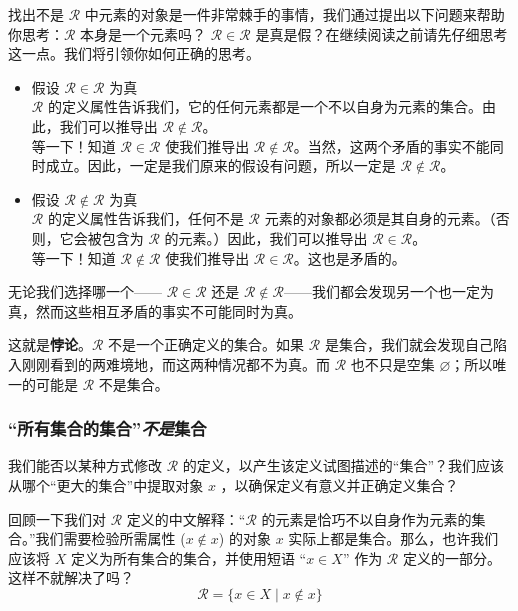 找出不是 $\mathcal{R}$ 中元素的对象是一件非常棘手的事情，我们通过提出以下问题来帮助你思考：$\mathcal{R}$ 本身是一个元素吗？ $\mathcal{R} \in \mathcal{R}$ 是真是假？在继续阅读之前请先仔细思考这一点。我们将引领你如何正确的思考。

\begin{itemize}
    \item 假设 $\mathcal{R} \in \mathcal{R}$ 为真 \\
    $\mathcal{R}$ 的定义属性告诉我们，它的任何元素都是一个不以自身为元素的集合。由此，我们可以推导出 $\mathcal{R} \notin \mathcal{R}$。\\
    等一下！知道 $\mathcal{R} \in \mathcal{R}$ 使我们推导出 $\mathcal{R} \notin \mathcal{R}$。当然，这两个矛盾的事实不能同时成立。因此，一定是我们原来的假设有问题，所以一定是 $\mathcal{R} \notin \mathcal{R}$。
    \item 假设 $\mathcal{R} \notin \mathcal{R}$ 为真 \\
    $\mathcal{R}$ 的定义属性告诉我们，任何不是 $\mathcal{R}$ 元素的对象都必须是其自身的元素。（否则，它会被包含为 $\mathcal{R}$ 的元素。）因此，我们可以推导出 $\mathcal{R} \in \mathcal{R}$。\\
    等一下！知道 $\mathcal{R} \notin \mathcal{R}$ 使我们推导出 $\mathcal{R} \in \mathcal{R}$。这也是矛盾的。
\end{itemize}
无论我们选择哪一个—— $\mathcal{R} \in \mathcal{R}$ 还是 $\mathcal{R} \notin \mathcal{R}$——我们都会发现另一个也一定为真，然而这些相互矛盾的事实不可能同时为真。

这就是\textbf{悖论}。$\mathcal{R}$ 不是一个正确定义的集合。如果 $\mathcal{R}$ 是集合，我们就会发现自己陷入刚刚看到的两难境地，而这两种情况都不为真。而 $\mathcal{R}$ 也不只是空集 $\varnothing$；所以唯一的可能是 $\mathcal{R}$ 不是集合。

\subsubsection*{``所有集合的集合''\emph{不是}集合}

我们能否以某种方式修改 $\mathcal{R}$ 的定义，以产生该定义试图描述的``集合''？我们应该从哪个``更大的集合''中提取对象 $x$ ，以确保定义有意义并正确定义集合？

回顾一下我们对 $\mathcal{R}$ 定义的中文解释：``$\mathcal{R}$ 的元素是恰巧不以自身作为元素的集合。''我们需要检验所需属性 ($x \notin x$) 的对象 $x$ 实际上都是集合。那么，也许我们应该将 $X$ 定义为所有集合的集合，并使用短语 ``$x \in X$'' 作为 $\mathcal{R}$ 定义的一部分。这样不就解决了吗？
\[\mathcal{R} = \{x \in X \mid x \notin x\}\]

